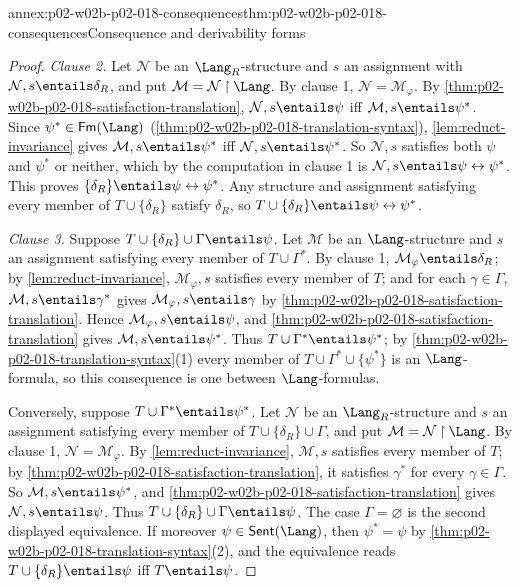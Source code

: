 \begin{annexitem}{annex:p02-w02b-p02-018-consequences}{thm:p02-w02b-p02-018-consequences}{Consequence and derivability forms}
\begin{proof}
\emph{Clause 2.}  Let \(\mathcal N\) be an \(\Lang_R\)-structure and \(s\)
an assignment with \(\mathcal N,s\entails\delta_R\), and put
\(\mathcal M=\mathcal N\mathbin{\upharpoonright}\Lang\).  By clause 1,
\(\mathcal N=\mathcal M_{\varphi}\).  By
\cref{thm:p02-w02b-p02-018-satisfaction-translation},
\(\mathcal N,s\entails\psi\) iff \(\mathcal M,s\entails\psi^{*}\).  Since
\(\psi^{*}\in\mathsf{Fm}(\Lang)\)
(\cref{thm:p02-w02b-p02-018-translation-syntax}),
\cref{lem:reduct-invariance} gives \(\mathcal M,s\entails\psi^{*}\) iff
\(\mathcal N,s\entails\psi^{*}\).  So \(\mathcal N,s\) satisfies both
\(\psi\) and \(\psi^{*}\) or neither, which by the computation in clause 1
is \(\mathcal N,s\entails\psi\leftrightarrow\psi^{*}\).  This proves
\(\{\delta_R\}\entails\psi\leftrightarrow\psi^{*}\).  Any structure and
assignment satisfying every member of \(T\cup\{\delta_R\}\) satisfy
\(\delta_R\), so \(T\cup\{\delta_R\}\entails\psi\leftrightarrow\psi^{*}\).

\emph{Clause 3.}  Suppose \(T\cup\{\delta_R\}\cup\Gamma\entails\psi\).  Let
\(\mathcal M\) be an \(\Lang\)-structure and \(s\) an assignment satisfying
every member of \(T\cup\Gamma^{*}\).  By clause 1,
\(\mathcal M_{\varphi}\entails\delta_R\); by \cref{lem:reduct-invariance},
\(\mathcal M_{\varphi},s\) satisfies every member of \(T\); and for each
\(\gamma\in\Gamma\), \(\mathcal M,s\entails\gamma^{*}\) gives
\(\mathcal M_{\varphi},s\entails\gamma\) by
\cref{thm:p02-w02b-p02-018-satisfaction-translation}.  Hence
\(\mathcal M_{\varphi},s\entails\psi\), and
\cref{thm:p02-w02b-p02-018-satisfaction-translation} gives
\(\mathcal M,s\entails\psi^{*}\).  Thus \(T\cup\Gamma^{*}\entails\psi^{*}\);
by \cref{thm:p02-w02b-p02-018-translation-syntax}(1) every member of
\(T\cup\Gamma^{*}\cup\{\psi^{*}\}\) is an \(\Lang\)-formula, so this
consequence is one between \(\Lang\)-formulas.

Conversely, suppose \(T\cup\Gamma^{*}\entails\psi^{*}\).  Let \(\mathcal N\)
be an \(\Lang_R\)-structure and \(s\) an assignment satisfying every member
of \(T\cup\{\delta_R\}\cup\Gamma\), and put
\(\mathcal M=\mathcal N\mathbin{\upharpoonright}\Lang\).  By clause 1,
\(\mathcal N=\mathcal M_{\varphi}\).  By \cref{lem:reduct-invariance},
\(\mathcal M,s\) satisfies every member of \(T\); by
\cref{thm:p02-w02b-p02-018-satisfaction-translation}, it satisfies
\(\gamma^{*}\) for every \(\gamma\in\Gamma\).  So
\(\mathcal M,s\entails\psi^{*}\), and
\cref{thm:p02-w02b-p02-018-satisfaction-translation} gives
\(\mathcal N,s\entails\psi\).  Thus
\(T\cup\{\delta_R\}\cup\Gamma\entails\psi\).  The case
\(\Gamma=\varnothing\) is the second displayed equivalence.  If moreover
\(\psi\in\mathsf{Sent}(\Lang)\), then \(\psi^{*}=\psi\) by
\cref{thm:p02-w02b-p02-018-translation-syntax}(2), and the equivalence
reads \(T\cup\{\delta_R\}\entails\psi\) iff \(T\entails\psi\).


\end{proof}
\end{annexitem}
